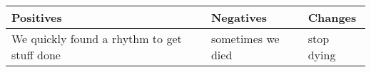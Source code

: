 \begin{center}
\begin{tabulary}
{ \textwidth }
{ J | J | J }
\textbf{Positives} & \textbf{Negatives} & \textbf{Changes} \\ \hline
We quickly found a rhythm to get stuff done & sometimes we died & stop dying
 
\end{tabulary}
\end{center}